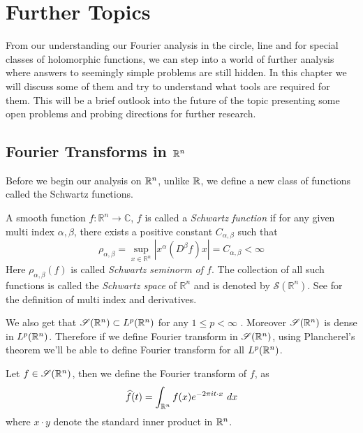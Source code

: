 
\chapter{Further Topics}

From our understanding our Fourier analysis in the circle, line and for special classes of holomorphic functions, we can step into a world of further analysis where answers to seemingly simple problems are still hidden. In this chapter we will discuss some of them and try to understand what tools are required for them. This will be a brief outlook into the future of the topic presenting some open problems and probing directions for further research.

\section{Fourier Transforms in $\mathbb R^n$}
Before we begin our analysis on $\mathbb R^n$, unlike $\mathbb R$, we define a new class of functions called the Schwartz functions. 

\begin{definition}
\label{def:schwartz_class}
A smooth function $f:\mathbb{R}^n \to \mathbb{C}$, $f$ is called a \emph{Schwartz function} if for any given multi index $\alpha, \beta$, there exists a positive constant $C_{\alpha, \beta}$ such that $$\rho_{\alpha, \beta} = \sup_{x \in \mathbb{R}^n} \left|x^\alpha (D^\beta f)x \right| = C_{\alpha, \beta} < \infty$$ 
Here $\rho_{\alpha, \beta}(f)$ is called \emph{Schwartz seminorm of $f$}. The collection of all such functions is called the \emph{Schwartz space} of $\mathbb{R}^n$ and is denoted by $\mathscr{S}(\mathbb{R}^n)$. 
See \autocite[Section~2.2]{Grafakos_Classical_Fourier} for the definition of multi index and derivatives.
\end{definition}
We also get that $\mathscr{S}(\mathbb R^n) \subset L^p(\mathbb R^n)$ for any $1\le p < \infty$ \autocite[Proposition~2.2.6 \pno~106]{Grafakos_Classical_Fourier}. Moreover $\mathscr{S}(\mathbb R^n)$ is dense in $L^p(\mathbb R^n)$. Therefore if we define Fourier transform in $\mathscr{S}(\mathbb R^n)$, using Plancherel's theorem we'll be able to define Fourier transform for all $L^p(\mathbb R^n)$.

\begin{definition}
  \label{def:fourier_transform_in_Rn}
  Let $f \in \mathscr{S}(\mathbb R^n)$, then we define the Fourier transform of $f$, as $$\widehat{f}(t) = \int_{\mathbb R^n} f(x) e^{-2\pi i t\cdot x} \ dx $$
  where $x \cdot y$ denote the standard inner product in $\mathbb R^n$.
\end{definition}

